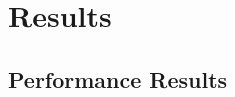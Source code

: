 \documentclass{webofc}
\begin{document}
\section{Results}
\label{results}

\subsection{Performance Results}
\label{performance}

\begin{figure}
\centering
    \begin{minipage}{.48\textwidth}
 　 \end{minipage}\hfill
    \begin{minipage}{.48\textwidth}

\end{minipage}
\end{figure}
\end{document}

